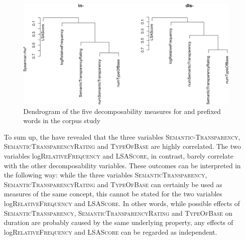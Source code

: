 \begin{figure}  
	
	\includegraphics[scale=0.5]{images/Corpus/clusterAnalysisDecomposabilityCorpusDisAndIn.png}
	\caption{Dendrogram of the five decomposability measures for  and prefixed words in the corpus study}
	\label{fig:cluster corpus dis and in}
\end{figure}



To sum up, the  have revealed that the three variables \textsc{Semantic-Transparency}, \textsc{SemanticTransparencyRating} and \textsc{TypeOfBase} are highly correlated. The two variables log\textsc{RelativeFrequency} and \textsc{LSAScore}, in contrast, barely correlate with the other decomposability variables.
These outcomes can be interpreted in the following way: while the three variables  \textsc{SemanticTransparency}, \textsc{SemanticTransparencyRating} and \textsc{TypeOfBase} can certainly be used as measures of the same concept, this cannot be stated for the two variables log\textsc{RelativeFrequency} and \textsc{LSAScore}. In other words,  while possible effects of \textsc{SemanticTransparency}, \textsc{SemanticTransparencyRating} and \textsc{TypeOfBase} on duration are probably caused by the same underlying property, any effects of log\textsc{RelativeFrequency} and \textsc{LSAScore} can be regarded as independent.


